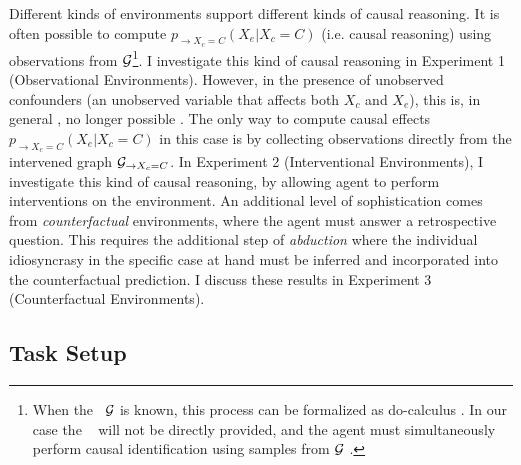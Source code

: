 Different kinds of environments support different kinds of causal reasoning. It is often possible to compute $p_{\rightarrow X_c = C}(X_e|X_c = C)$ (i.e. causal reasoning) using observations from ${\cal G}$\footnote{When the \CBN~${\cal G}$ is known, this process can be formalized as do-calculus \citep{pearl2000,pearl16causal}. In our case the \CBN~ will not be directly provided, and the agent must simultaneously perform causal identification using samples from ${\cal G}$ \citep{heckerman1995learning}.}. I investigate this kind of causal reasoning in Experiment 1 (Observational Environments). However, in the presence of unobserved confounders (an unobserved variable that affects both $X_c$ and $X_e$), this is, in general , no longer possible \citep{pearl2000}. The only way to compute causal effects $p_{\rightarrow X_c = C}(X_e|X_c = C)$ in this case is by collecting observations directly from the intervened graph ${\cal G}_{\rightarrow X_c = C}$. In Experiment 2 (Interventional Environments), I investigate this kind of causal reasoning, by allowing agent to perform interventions on the environment. An additional level of sophistication comes from \textit{counterfactual} environments, where the agent must answer a retrospective question. This requires the additional step of \textit{abduction} where the individual idiosyncrasy in the specific case at hand must be inferred and incorporated into the counterfactual prediction. I discuss these results in Experiment 3 (Counterfactual Environments).


\subsection{Task Setup}
\label{sec:task}

